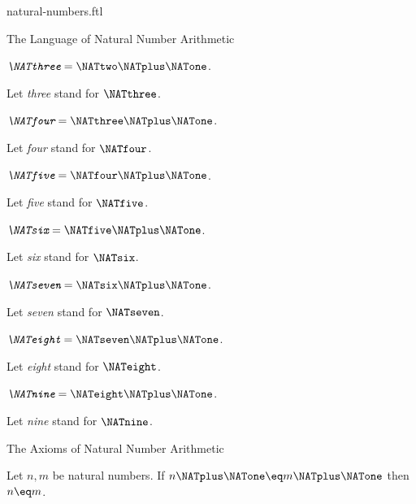 \documentclass{naproche-library}
\begin{document}
\begin{smodule}[title=Natural Numbers]{natural-numbers.ftl}
\begin{sfragment}{The Language of Natural Number Arithmetic}
  \begin{definition}[forthel,id=ARITHMETIC_01_3836725109456896]
    $\emph{\NATthree} = \NATtwo \NATplus \NATone$.

    Let \emph{three} stand for $\NATthree$.
  \end{definition}

  \begin{definition}[forthel,id=ARITHMETIC_01_1709884968009728]
    $\emph{\NATfour} = \NATthree \NATplus \NATone$.

    Let \emph{four} stand for $\NATfour$.
  \end{definition}

  \begin{definition}[forthel,id=ARITHMETIC_01_6734726333202432]
    $\emph{\NATfive} = \NATfour \NATplus \NATone$.

    Let \emph{five} stand for $\NATfive$.
  \end{definition}

  \begin{definition}[forthel,id=ARITHMETIC_01_949139189792768]
    $\emph{\NATsix} = \NATfive \NATplus \NATone$.

    Let \emph{six} stand for $\NATsix$.
  \end{definition}

  \begin{definition}[forthel,id=ARITHMETIC_01_7245471749767168]
    $\emph{\NATseven} = \NATsix \NATplus \NATone$.

    Let \emph{seven} stand for $\NATseven$.
  \end{definition}

  \begin{definition}[forthel,id=ARITHMETIC_01_5658172888973312]
    $\emph{\NATeight} = \NATseven \NATplus \NATone$.

    Let \emph{eight} stand for $\NATeight$.
  \end{definition}

  \begin{definition}[forthel,id=ARITHMETIC_01_7371844250238976]
    $\emph{\NATnine} = \NATeight \NATplus \NATone$.

    Let \emph{nine} stand for $\NATnine$.
  \end{definition}
\end{sfragment}

\begin{sfragment}{The Axioms of Natural Number Arithmetic}
  \begin{axiom}[forthel,id=ARITHMETIC_01_3604163883696128]
    Let $n, m$ be natural numbers.
    If $n \NATplus \NATone \eq m \NATplus \NATone$ then $n \eq m$.
  \end{axiom}


\end{sfragment}
\end{smodule}
\end{document}
